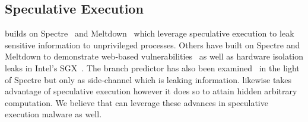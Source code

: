 \subsection{Speculative Execution}

\speculake builds on Spectre~\cite{spectre} and Meltdown~\cite{meltdown} which
leverage speculative execution to leak sensitive information to unprivileged
processes.  Others have built on Spectre and Meltdown to demonstrate web-based
vulnerabilities~\cite{genkin2018drive, schwarz2018netspectre} as well as
hardware isolation leaks in Intel's SGX~\cite{spectre_sgx,chen2018sgxpectre}.
The branch predictor has also been examined~\cite{evtyushkin2018branchscope} in
the light of Spectre but only as side-channel which is leaking information.
\speculake likewise takes advantage of speculative execution however it does so
to attain hidden arbitrary computation. We believe that \speculake can leverage
these advances in speculative execution malware as well.
